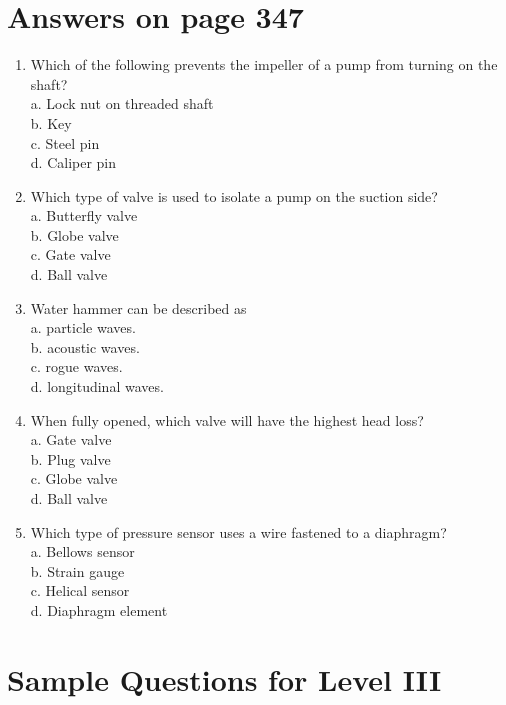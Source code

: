 \documentclass[10pt]{article}
\begin{document}
\section{Answers on page 347}
\begin{enumerate}
  \item Which of the following prevents the impeller of a pump from turning on the shaft?\\
a. Lock nut on threaded shaft\\
b. Key\\
c. Steel pin\\
d. Caliper pin

  \item Which type of valve is used to isolate a pump on the suction side?\\
a. Butterfly valve\\
b. Globe valve\\
c. Gate valve\\
d. Ball valve

  \item Water hammer can be described as\\
a. particle waves.\\
b. acoustic waves.\\
c. rogue waves.\\
d. longitudinal waves.

  \item When fully opened, which valve will have the highest head loss?\\
a. Gate valve\\
b. Plug valve\\
c. Globe valve\\
d. Ball valve

  \item Which type of pressure sensor uses a wire fastened to a diaphragm?\\
a. Bellows sensor\\
b. Strain gauge\\
c. Helical sensor\\
d. Diaphragm element

\end{enumerate}

\section{Sample Questions for Level III}
\end{document}
